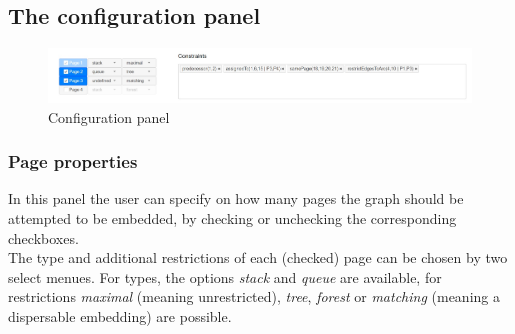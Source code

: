 \subsection{The configuration panel}
\begin{figure}[!h]
\begin{center}
\includegraphics[width=1\textwidth]{figures/figIndex/ConfigPanel.jpg}
\caption{Configuration panel}
\label{img:confPan}
\end{center}
\end{figure}
\subsubsection{Page properties}
\label{imp_pages}
In this panel the user can specify on how many pages the graph should be attempted to be embedded, by checking or unchecking the corresponding checkboxes.\\
The type and additional restrictions of each (checked) page can be chosen by two select menues. For types, the options \textit{stack} and \textit{queue} are available, for restrictions \textit{maximal} (meaning unrestricted), \textit{tree}, \textit{forest} or \textit{matching} (meaning a dispersable embedding) are possible.
